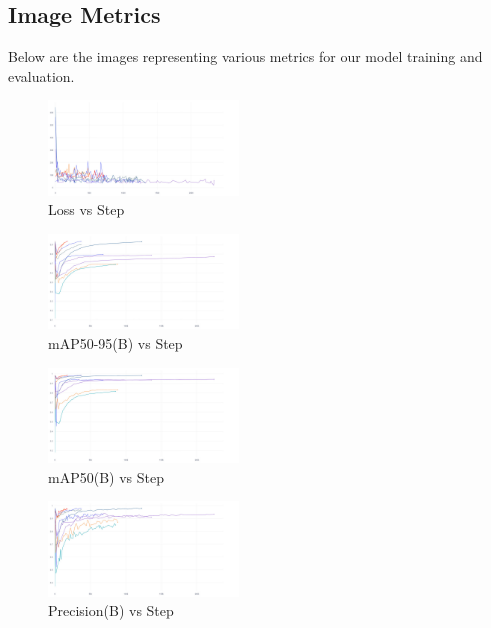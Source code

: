 \documentclass[11pt]{IEEEtran}
\begin{document}
\subsection{Image Metrics}
Below are the images representing various metrics for our model training and
evaluation.

\begin{figure}[ht!]
    \centering
    \includegraphics[width=0.45\textwidth]{loss VS step.jpeg}
    \caption{Loss vs Step}
\end{figure}

\begin{figure}[ht!]
    \centering
    \includegraphics[width=0.45\textwidth]{metrics_mAP50-95(B) VS step.jpeg}
    \caption{mAP50-95(B) vs Step}
\end{figure}

\begin{figure}[ht!]
    \centering
    \includegraphics[width=0.45\textwidth]{metrics_mAP50(B) VS step.jpeg}
    \caption{mAP50(B) vs Step}
\end{figure}

\begin{figure}[ht!]
    \centering
    \includegraphics[width=0.45\textwidth]{metrics_precision(B) VS step.jpeg}
    \caption{Precision(B) vs Step}
\end{figure}
\end{document}
